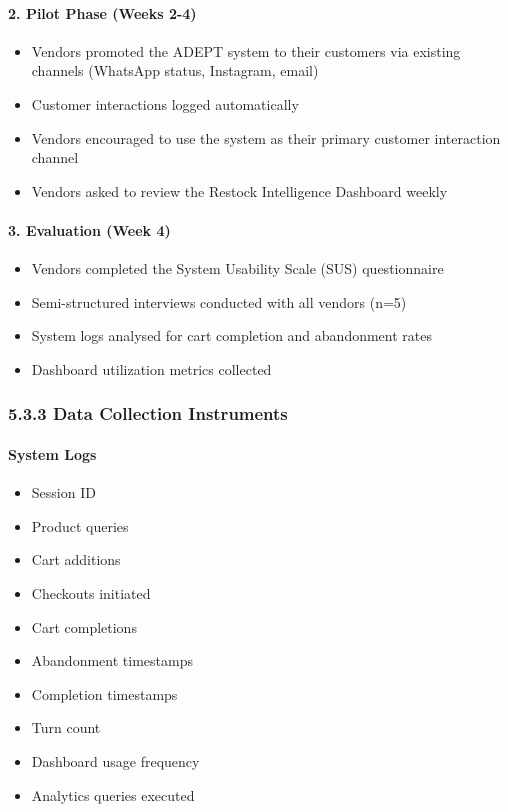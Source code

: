 \documentclass[12pt,a4paper]{article}
\begin{document}
\paragraph{2. Pilot Phase (Weeks 2-4)}

\begin{itemize}
    \item Vendors promoted the ADEPT system to their customers via existing channels (WhatsApp status, Instagram, email)
    \item Customer interactions logged automatically
    \item Vendors encouraged to use the system as their primary customer interaction channel
    \item Vendors asked to review the Restock Intelligence Dashboard weekly
\end{itemize}

\paragraph{3. Evaluation (Week 4)}

\begin{itemize}
    \item Vendors completed the System Usability Scale (SUS) questionnaire
    \item Semi-structured interviews conducted with all vendors (n=5)
    \item System logs analysed for cart completion and abandonment rates
    \item Dashboard utilization metrics collected
\end{itemize}

\subsubsection{5.3.3 Data Collection Instruments}

\paragraph{System Logs}

\begin{itemize}
    \item Session ID
    \item Product queries
    \item Cart additions
    \item Checkouts initiated
    \item Cart completions
    \item Abandonment timestamps
    \item Completion timestamps
    \item Turn count
    \item Dashboard usage frequency
    \item Analytics queries executed
\end{itemize}
\end{document}
